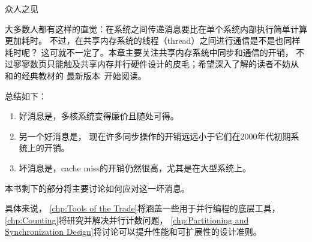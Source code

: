 
%
	 {众人之见}

大多数人都有这样的直觉：在系统之间传递消息要比在单个系统内部执行简单计算更加耗时。
不过，在共享内存系统的线程（thread）之间进行通信是不是也同样耗时呢？
这可就不一定了。本章主要关注共享内存系统中同步和通信的开销，
不过寥寥数页只能触及共享内存并行硬件设计的皮毛；希望深入了解的读者不妨从
和的经典教材的
最新版本~\cite{Hennessy2026}开始阅读。

\QuickQuizEnd






总结如下：

\begin{enumerate}
\item	好消息是，多核系统变得廉价且随处可得。
\item	另一个好消息是，
	现在许多同步操作的开销远远小于它们在2000年代初期系统上的开销。
\item	坏消息是，cache miss的开销仍然很高，尤其是在大型系统上。
\end{enumerate}

本书剩下的部分将主要讨论如何应对这一坏消息。

具体来说，
\cref{chp:Tools of the Trade}将涵盖一些用于并行编程的底层工具，
\cref{chp:Counting}将研究并解决并行计数问题，
\cref{chp:Partitioning and Synchronization Design}将讨论可以提升性能和可扩展性的设计准则。

